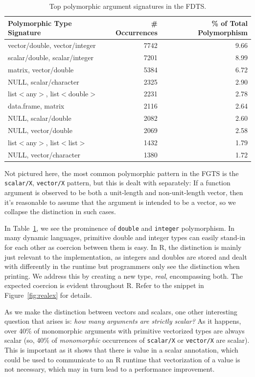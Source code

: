 \documentclass[acmsmall,10pt,review,anonymous]{acmart}\settopmatter{printfolios=true,printccs=false,printacmref=false}
\begin{document}
\begin{table}[ht]
\label{tab:toppolyFDTS}
\centering
\begin{tabular}{lrr}
  \hline
 Polymorphic Type Signature & \# Occurrences & \% of Total Polymorphism \\ 
  \hline
  vector/double, vector/integer & 7742 & 9.66 \\ 
  scalar/double, scalar/integer & 7201 & 8.99 \\ 
  matrix, vector/double & 5384 & 6.72 \\ 
  NULL, scalar/character & 2325 & 2.90 \\ 
  list$<$any$>$, list$<$double$>$ & 2231 & 2.78 \\ 
  data.frame, matrix & 2116 & 2.64 \\ 
  NULL, scalar/double & 2082 & 2.60 \\ 
  NULL, vector/double & 2069 & 2.58 \\ 
  list$<$any$>$, list$<$list$>$ & 1432 & 1.79 \\ 
  NULL, vector/character & 1380 & 1.72 \\
     \hline
\end{tabular}
\caption{Top polymorphic argument signatures in the FDTS.}
\end{table}

Not pictured here, the most common polymorphic pattern in the FGTS is the {\tt scalar/X}, {\tt vector/X} pattern, but this is dealt with separately:
If a function argument is observed to be both a unit-length and non-unit-length vector, then it's reasonable to assume that the argument is intended to be a vector, so we collapse the distinction in such cases.

In Table~\ref{tab:toppolyFDTS}, we see the prominence of {\tt double} and {\tt integer} polymorphism.
In many dynamic languages, primitive double and integer types can easily stand-in for each other as coercion between them is easy.
In R, the distinction is mainly just relevant to the implementation, as integers and doubles are stored and dealt with differently in the runtime but programmers only see the distinction when printing.
We address this by creating a new type, {\it real}, encompassing both.
The expected coercion is evident throughout R.
Refer to the snippet in Figure~\ref{fig:realex} for details.

As we make the distinction between vectors and scalars, one other interesting question that arises is: {\it how many arguments are strictly scalar?}
As it happens, over 40\% of monomorphic arguments with primitive vectorized types are always scalar (so, 40\% of {\it monomorphic} occurrences of {\tt scalar/X} or {\tt vector/X} are scalar).
This is important as it shows that there is value in a scalar annotation, which could be used to communicate to an R runtime that vectorization of a value is not necessary, which may in turn lead to a performance improvement.
\end{document}
